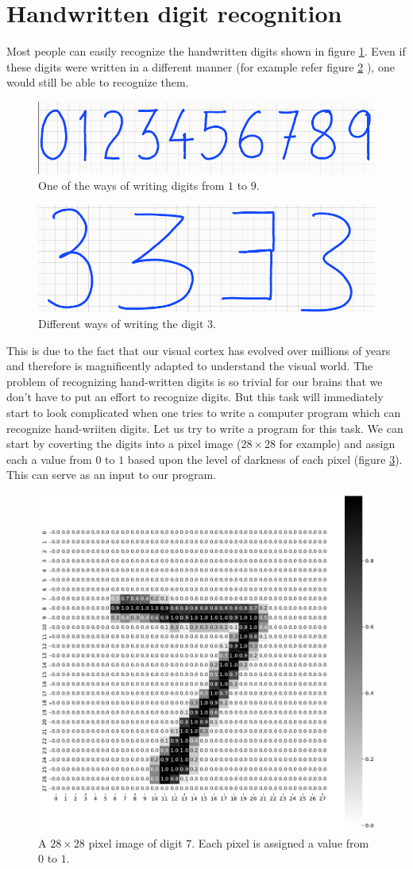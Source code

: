 \section{Handwritten digit recognition}
Most people can easily recognize the handwritten digits shown in figure \ref{fig:my_digits}. Even if these digits were written 
in a different manner (for example refer figure \ref{fig:my_threes} ), one would still be able to recognize them. 
\begin{figure}[htbp]
    \centering
    \includegraphics[width=.6\textwidth]{Figures/digits.png}
    \caption{One of the ways of writing digits from $1$ to $9$.}
    \label{fig:my_digits}
\end{figure} 
\begin{figure}[htbp]
    \centering
    \includegraphics[width=.3\textwidth]{Figures/three_digit.png}
    \caption{Different ways of writing the digit $3$.}
    \label{fig:my_threes}
\end{figure} This is due to the fact that our visual cortex has evolved over millions of years and therefore is magnificently 
adapted to understand the visual world. The problem of recognizing hand-written digits is so trivial 
for our brains that we don't have to put an effort to recognize digits. But this task will immediately 
start to look complicated when one tries to write a computer program which can recognize hand-wriiten 
digits. 
Let us try to write a program for this task. We can start by coverting the digits into a pixel 
image ($28 \times 28$ for example) and assign each a value from $0$ to $1$ based upon the level of darkness
of each pixel (figure \ref{fig:pix7}). This can serve as an input to our program. 
\begin{figure}[htbp]
    \centering
    \includegraphics[width=.35\textwidth]{Figures/pixel_image_7.png}
    \caption{A $28 \times 28$ pixel image of digit $7$. Each pixel is assigned a value from $0$ to $1$.}
    \label{fig:pix7}
\end{figure} 
